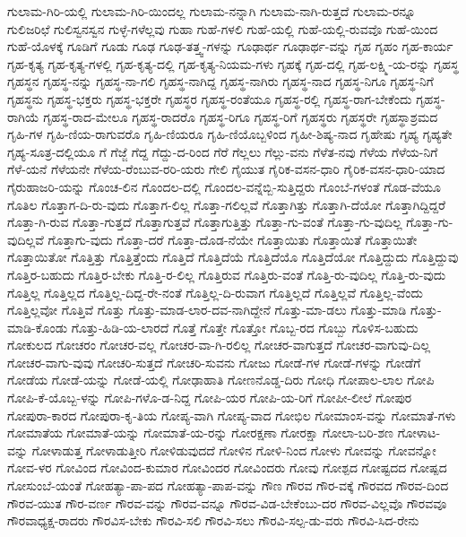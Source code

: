 {ಗುಲಾಮ-ಗಿರಿ-ಯಲ್ಲಿ
ಗುಲಾಮ-ಗಿರಿ-ಯಿಂದಲ್ಲ
ಗುಲಾಮ-ನನ್ನಾಗಿ
ಗುಲಾಮ-ನಾಗಿ-ರುತ್ತದೆ
ಗುಲಾಮ-ರನ್ನೂ
ಗುಲಿಜರಿಛೆ
ಗುಲಿಸ್ವನಸ್ವನ
ಗುಳ್ಳೆ-ಗಳೆಲ್ಲವು
ಗುಹಾ
ಗುಹೆ-ಗಳಲಿ
ಗುಹೆ-ಯಲ್ಲಿ
ಗುಹೆ-ಯಲ್ಲಿ-ರುವವೊ
ಗುಹೆ-ಯಿಂದ
ಗುಹೆ-ಯೊಳಕ್ಕೆ
ಗೂಡಿಗೆ
ಗೂಡು
ಗೂಢ
ಗೂಢ-ತತ್ತ್ವ-ಗಳನ್ನು
ಗೂಢಾರ್ಥ
ಗೂಢಾರ್ಥ-ವನ್ನು
ಗೃಹ
ಗೃಹಂ
ಗೃಹ-ಕಾರ್ಯ
ಗೃಹ-ಕೃತ್ಯ
ಗೃಹ-ಕೃತ್ಯ-ಗಳಲ್ಲಿ
ಗೃಹ-ಕೃತ್ಯ-ದಲ್ಲಿ
ಗೃಹ-ಕೃತ್ಯ-ನಿಯಮ-ಗಳು
ಗೃಹಕ್ಕೆ
ಗೃಹ-ದಲ್ಲಿ
ಗೃಹ-ಲಕ್ಷ್ಮಿ-ಯ-ರನ್ನು
ಗೃಹಸ್ಥ
ಗೃಹಸ್ಥನ
ಗೃಹಸ್ಥ-ನನ್ನು
ಗೃಹಸ್ಥ-ನಾ-ಗಲಿ
ಗೃಹಸ್ಥ-ನಾಗಿದ್ದ
ಗೃಹಸ್ಥ-ನಾಗಿರು
ಗೃಹಸ್ಥ-ನಾದ
ಗೃಹಸ್ಥ-ನಿಗೂ
ಗೃಹಸ್ಥ-ನಿಗೆ
ಗೃಹಸ್ಥನು
ಗೃಹಸ್ಥ-ಭಕ್ತರು
ಗೃಹಸ್ಥ-ಭಕ್ತರೇ
ಗೃಹಸ್ಥರ
ಗೃಹಸ್ಥ-ರಂತೆಯೂ
ಗೃಹಸ್ಥ-ರಲ್ಲಿ
ಗೃಹಸ್ಥ-ರಾಗ-ಬೇಕೆಂದು
ಗೃಹಸ್ಥ-ರಾಗಿಯೆ
ಗೃಹಸ್ಥ-ರಾದ-ಮೇಲೂ
ಗೃಹಸ್ಥ-ರಾದರೊ
ಗೃಹಸ್ಥ-ರಿಗೂ
ಗೃಹಸ್ಥ-ರಿಗೆ
ಗೃಹಸ್ಥರು
ಗೃಹಸ್ಥರೇ
ಗೃಹಸ್ಥಾಶ್ರಮದ
ಗೃಹಿ-ಗಳ
ಗೃಹಿ-ಣಿಯ-ರಾಗುವರೊ
ಗೃಹಿ-ಣಿಯರೂ
ಗೃಹಿ-ಣಿಯೊಬ್ಬಳಿಂದ
ಗೃಹೀ-ಶಿಷ್ಯ-ನಾದ
ಗೃಹೇಷು
ಗೃಹ್ಯ
ಗೃಹ್ಯತೇ
ಗೃಹ್ಯ-ಸೂತ್ರ-ದಲ್ಲಿಯೂ
ಗೆ
ಗೆಜ್ಜೆ
ಗೆದ್ದ
ಗೆದ್ದು-ದ-ರಿಂದ
ಗೆರೆ
ಗೆಲ್ಲಲು
ಗೆಲ್ಲು-ವನು
ಗೆಳೆತ-ನವು
ಗೆಳೆಯ
ಗೆಳೆಯ-ನಿಗೆ
ಗೆಳೆ-ಯನೆ
ಗೆಳೆಯನೇ
ಗೆಳೆಯ-ರೆಂಬುವ-ರರಿ-ಯರು
ಗೇಲಿ
ಗೈಯುತ
ಗೈರಿಕ-ವಸನ-ಧಾರಿ
ಗೈರಿಕ-ವಸನ-ಧಾರಿ-ಯಾದ
ಗೈರುಹಾಜರಿ-ಯನ್ನು
ಗೊಂಚ-ಲಿನ
ಗೊಂದಲ-ದಲ್ಲಿ
ಗೊಂದಲ-ವನ್ನೆಬ್ಬಿ-ಸುತ್ತಿದ್ದರು
ಗೊಂಬೆ-ಗಳಂತೆ
ಗೊಡ-ವೆಯೂ
ಗೊತಿಲ
ಗೊತ್ತಾಗ-ದಿ-ರು-ವುದು
ಗೊತ್ತಾಗ-ಲಿಲ್ಲ
ಗೊತ್ತಾ-ಗಲಿಲ್ಲವೆ
ಗೊತ್ತಾಗಿತ್ತು
ಗೊತ್ತಾಗಿ-ದೆಯೋ
ಗೊತ್ತಾಗಿದ್ದಿದ್ದರೆ
ಗೊತ್ತಾ-ಗಿ-ರುವ
ಗೊತ್ತಾ-ಗುತ್ತದೆ
ಗೊತ್ತಾಗುತ್ತವೆ
ಗೊತ್ತಾಗುತ್ತಿತ್ತು
ಗೊತ್ತಾ-ಗು-ವಂತೆ
ಗೊತ್ತಾ-ಗು-ವುದಿಲ್ಲ
ಗೊತ್ತಾ-ಗು-ವುದಿಲ್ಲವೆ
ಗೊತ್ತಾಗು-ವುದು
ಗೊತ್ತಾ-ದರೆ
ಗೊತ್ತಾ-ದೊಡ-ನೆಯೇ
ಗೊತ್ತಾಯಿತು
ಗೊತ್ತಾಯಿತೆ
ಗೊತ್ತಾಯಿತೇ
ಗೊತ್ತಾಯಿತೋ
ಗೊತ್ತಿತ್ತು
ಗೊತ್ತಿತ್ತೆಂದು
ಗೊತ್ತಿದೆ
ಗೊತ್ತಿದೆಯೆ
ಗೊತ್ತಿದೆಯೊ
ಗೊತ್ತಿದೆಯೋ
ಗೊತ್ತಿದ್ದುದು
ಗೊತ್ತಿದ್ದುವು
ಗೊತ್ತಿರ-ಬಹುದು
ಗೊತ್ತಿರ-ಬೇಕು
ಗೊತ್ತಿ-ರ-ಲಿಲ್ಲ
ಗೊತ್ತಿರುವ
ಗೊತ್ತಿರು-ವಂತೆ
ಗೊತ್ತಿ-ರು-ವುದಿಲ್ಲ
ಗೊತ್ತಿ-ರು-ವುದು
ಗೊತ್ತಿಲ್ಲ
ಗೊತ್ತಿಲ್ಲದ
ಗೊತ್ತಿಲ್ಲ-ದಿದ್ದ-ರೇ-ನಂತೆ
ಗೊತ್ತಿಲ್ಲ-ದಿ-ರುವಾಗ
ಗೊತ್ತಿಲ್ಲದೆ
ಗೊತ್ತಿಲ್ಲವೆ
ಗೊತ್ತಿಲ್ಲ-ವೆಂದು
ಗೊತ್ತಿಲ್ಲವೋ
ಗೊತ್ತಿವೆ
ಗೊತ್ತು
ಗೊತ್ತು-ಮಾಡ-ಲಾರ-ದವ-ನಾಗಿದ್ದೇನೆ
ಗೊತ್ತು-ಮಾ-ಡಲು
ಗೊತ್ತು-ಮಾಡಿ
ಗೊತ್ತು-ಮಾಡಿ-ಕೊಂಡು
ಗೊತ್ತು-ಹಿಡಿ-ಯ-ಲಾರದೆ
ಗೊತ್ತೆ
ಗೊತ್ತೇ
ಗೊತ್ತೋ
ಗೊಬ್ಬ-ರದ
ಗೊಬ್ಬು
ಗೊಳಿಸ-ಬಹುದು
ಗೋಕುಲದ
ಗೋಚರಂ
ಗೋಚರ-ವಲ್ಲ
ಗೋಚರ-ವಾ-ಗಿ-ರಲಿಲ್ಲ
ಗೋಚರ-ವಾಗುತ್ತದೆ
ಗೋಚರ-ವಾಗುವು-ದಿಲ್ಲ
ಗೋಚರ-ವಾಗು-ವುವು
ಗೋಚರಿ-ಸುತ್ತದೆ
ಗೋಚರಿ-ಸುವನು
ಗೋಜು
ಗೋಡೆ-ಗಳ
ಗೋಡೆ-ಗಳನ್ನು
ಗೋಡೆಗೆ
ಗೋಡೆಯ
ಗೋಡೆ-ಯನ್ನು
ಗೋಡೆ-ಯಲ್ಲಿ
ಗೋಢಾಹಾತಿ
ಗೋಣನೊಡ್ಡ-ದಿರು
ಗೋಧಿ
ಗೋಪಾಲ-ಲಾಲ
ಗೋಪಿ
ಗೋಪಿ-ಕೆ-ಯೊಬ್ಬ-ಳನ್ನು
ಗೋಪಿ-ಗಳೊ-ಡ-ನಿದ್ದ
ಗೋಪಿ-ಯರ
ಗೋಪಿ-ಯ-ರಿಗೆ
ಗೋಪೀ-ಲೀಲೆ
ಗೋಪುರ
ಗೋಪುರಾ-ಕಾರದ
ಗೋಪುರಾ-ಕೃ-ತಿಯ
ಗೋಪ್ಯ-ವಾಗಿ
ಗೋಪ್ಯ-ವಾದ
ಗೋಭಿಲ
ಗೋಮಾಂಸ-ವನ್ನು
ಗೋಮಾತೆ-ಗಳು
ಗೋಮಾತೆಯ
ಗೋಮಾತೆ-ಯನ್ನು
ಗೋಮಾತೆ-ಯ-ರನ್ನು
ಗೋರಕ್ಷಣಾ
ಗೋರಕ್ಷಾ
ಗೋಲಾ-ಬರಿ-ಶಣ
ಗೋಳಾಟ-ವನ್ನು
ಗೋಳಾಡುತ್ತ
ಗೋಳಾಡುತ್ತೀರಿ
ಗೋಳಿಡುವುದದೆ
ಗೋಳಿನ
ಗೋಳಿ-ನಿಂದ
ಗೋಳು
ಗೋವನ್ನು
ಗೋವನ್ನೋ
ಗೋವ-ಳರ
ಗೋವಿಂದ
ಗೋವಿಂದ-ಕುಮಾರ
ಗೋವಿಂದರ
ಗೋವಿಂದರು
ಗೋವು
ಗೋಶ್ಪದ
ಗೋಷ್ಟದದ
ಗೋಷ್ಪದ
ಗೋಸುಂಬೆ-ಯಂತೆ
ಗೋಹತ್ಯಾ-ಪಾ-ಪದ
ಗೋಹತ್ಯಾ-ಪಾಪ-ವನ್ನು
ಗೌಣ
ಗೌರವ
ಗೌರ-ವಕ್ಕೆ
ಗೌರವದ
ಗೌರವ-ದಿಂದ
ಗೌರವ-ಯುತ
ಗೌರ-ವರ್ಣ
ಗೌರವ-ವನ್ನು
ಗೌರವ-ವನ್ನೂ
ಗೌರವ-ವಿಡ-ಬೇಕೆಂಬು-ದರ
ಗೌರವ-ವಿಲ್ಲವೊ
ಗೌರವವೂ
ಗೌರವಾಧ್ಯಕ್ಷ-ರಾದರು
ಗೌರವಿಸ-ಬೇಕು
ಗೌರವಿ-ಸಲಿ
ಗೌರವಿ-ಸಲು
ಗೌರವಿ-ಸಲ್ಪ-ಡು-ವರು
ಗೌರವಿ-ಸಿದ-ರೇನು
}
